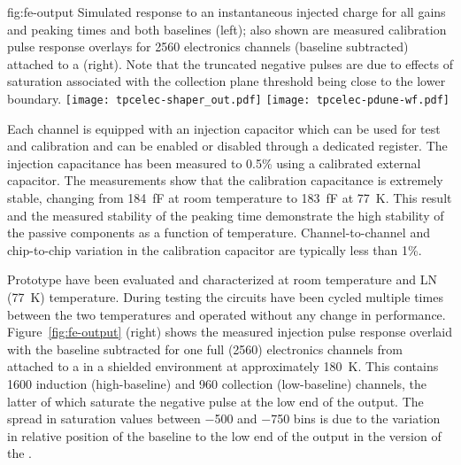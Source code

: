 \begin{dunefigure}
{fig:fe-output}
{Simulated  response to an instantaneous injected charge for all gains and peaking times and both baselines (left); also shown are measured calibration pulse response overlays for \num{2560} electronics channels (baseline subtracted) attached to a   (right).  Note that the truncated negative pulses are due to effects of saturation associated with the collection plane threshold being close to the lower  boundary.}
\texttt{[image: tpcelec-shaper\_out.pdf]}
\texttt{[image: tpcelec-pdune-wf.pdf]}
\end{dunefigure}

Each   channel is equipped with an injection capacitor which can be used
for test and calibration and can be enabled or disabled through a
dedicated register. The injection capacitance has been measured to \num{0.5}\% using 
a calibrated external capacitor. The measurements show
that the calibration capacitance is extremely stable, changing from
\SI{184}{fF} at room temperature to \SI{183}{fF} at \SI{77}{K}. This result and the measured
stability of the peaking time demonstrate the high stability of the
passive components as a function of temperature. Channel-to-channel and chip-to-chip
variation in the calibration capacitor are typically less than \num{1}\%. 

Prototype  have been evaluated and characterized at room temperature and LN 
(\SI{77}{K}) temperature.
During testing the circuits have been cycled multiple times
between the two temperatures and operated without any change in performance.
Figure~\ref{fig:fe-output} (right) shows the measured injection pulse response overlaid with the baseline subtracted for one full  
(\num{2560}) electronics channels from   attached to a   in a 
shielded environment at approximately \SI{180}{K}. This contains \num{1600} induction (high-baseline)
and \num{960} collection (low-baseline) channels, the latter of which saturate the negative pulse at the low 
end of the  output. The spread in saturation values between \num{-500} and \num{-750}  bins is due to the
variation in relative position of the  baseline to the low end of the  output 
in the  version of the .



